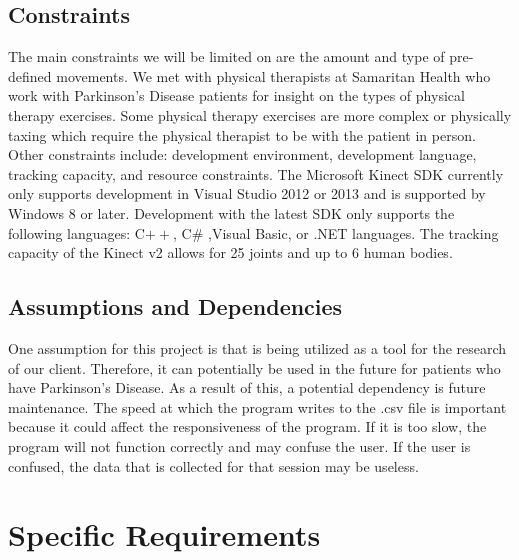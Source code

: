 \documentclass[onecolumn, draftclsnofoot,10pt, compsoc]{IEEEtran}
\begin{document}
\subsection{Constraints}
The main constraints we will be limited on are the amount and type of pre-defined 
movements. We met with physical therapists at Samaritan Health who work with Parkinson's Disease patients for insight on the types of physical therapy exercises. 
Some physical therapy exercises are more complex or physically taxing which 
require the physical therapist to be with the patient in person. Other constraints 
include: development environment, development language, tracking capacity, and 
resource constraints. The Microsoft Kinect SDK currently only supports development in 
Visual Studio 2012 or 2013 and is supported by Windows 8 or later. Development with 
the latest SDK only supports the following languages: C$++$, C\# ,Visual Basic, or .NET 
languages. The tracking capacity of the Kinect v2 allows for 25 joints and up to 6 
human bodies\cite{KinectConstraints}.

\subsection{Assumptions and Dependencies}
One assumption for this project is that is being utilized as a tool for the research 
of our client. Therefore, it can potentially be used in the future for patients who 
have Parkinson's Disease. As a result of this, a potential dependency is future 
maintenance. The speed at which the program writes to the .csv file is important 
because it could affect the responsiveness of the program. If it is too slow, the 
program will not function correctly and may confuse the user. If the user is confused, 
the data that is collected for that session may be useless.

\section{Specific Requirements}
\end{document}
